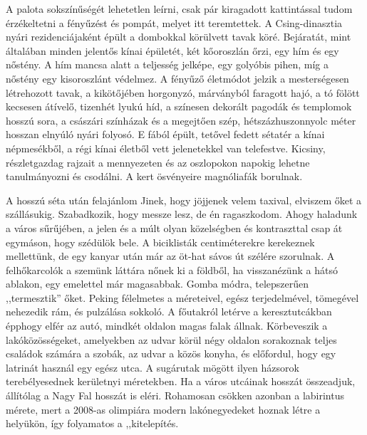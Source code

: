 A palota sokszínűségét lehetetlen leírni, csak pár kiragadott kattintással
tudom érzékeltetni a fényűzést és pompát, melyet itt teremtettek.
A Csing-dinasztia nyári rezidenciájaként épült a dombokkal körülvett
tavak köré. Bejáratát, mint általában minden jelentős kínai épületét, két
kőoroszlán őrzi, egy hím és egy nőstény. A hím mancsa alatt a teljesség
jelképe, egy golyóbis pihen, míg a nőstény egy kisoroszlánt védelmez.
A fényűző életmódot jelzik a mesterségesen létrehozott tavak, a kikötőjében
horgonyzó, márványból faragott hajó, a tó fölött kecsesen átívelő,
tizenhét lyukú híd, a színesen dekorált pagodák és templomok hosszú
sora, a császári színházak és a megejtően szép, hétszázhuszonnyolc méter
hosszan elnyúló nyári folyosó. E fából épült, tetővel fedett sétatér a kínai
népmesékből, a régi kínai életből vett jelenetekkel van telefestve. Kicsiny,
részletgazdag rajzait a mennyezeten és az oszlopokon napokig lehetne
tanulmányozni és csodálni. A kert ösvényeire magnóliafák borulnak.

A hosszú séta után felajánlom Jinek, hogy jöjjenek velem taxival,
elviszem őket a szállásukig. Szabadkozik, hogy messze lesz, de én
ragaszkodom. Ahogy haladunk a város sűrűjében, a jelen és a múlt olyan
közelségben és kontraszttal csap át egymáson, hogy szédülök bele.
A biciklisták centiméterekre kerekeznek mellettünk, de egy kanyar után már
az öt-hat sávos út szélére szorulnak. A felhőkarcolók a szemünk láttára
nőnek ki a földből, ha visszanézünk a hátsó ablakon, egy emelettel már
magasabbak. Gomba módra, telepszerűen ,,termesztik'' őket. Peking
félelmetes a méreteivel, egész terjedelmével, tömegével nehezedik rám, és
pulzálása sokkoló. A főutakról letérve a keresztutcákban épphogy elfér
az autó, mindkét oldalon magas falak állnak. Körbeveszik a lakóközösségeket,
amelyekben az udvar körül négy oldalon sorakoznak teljes családok
számára a szobák, az udvar a közös konyha, és előfordul, hogy egy
latrinát használ egy egész utca. A sugárutak mögött ilyen házsorok
terebélyesednek kerületnyi méretekben. Ha a város utcáinak hosszát
összeadjuk, állítólag a Nagy Fal hosszát is eléri. Rohamosan csökken azonban
a labirintus mérete, mert a 2008-as olimpiára modern lakónegyedeket
hoznak létre a helyükön, így folyamatos a ,,kitelepítés.

